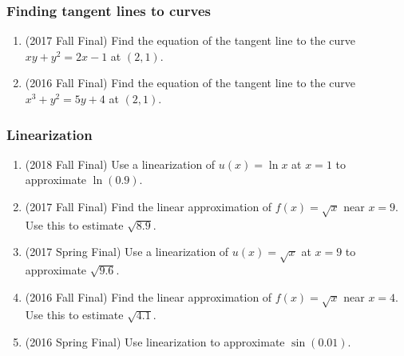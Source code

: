 \documentclass[10pt]{scrartcl}
\begin{document}
\subsubsection{Finding tangent lines to curves}
\begin{enumerate}
\item (2017 Fall Final) Find the equation of the tangent line to the curve $xy + y^2 = 2x - 1$ at $(2, 1)$.
\item (2016 Fall Final) Find the equation of the tangent line to the curve $x^3 + y^2 = 5y + 4$ at $(2, 1)$.
\end{enumerate}

\subsubsection{Linearization}
\begin{enumerate}
\item (2018 Fall Final) Use a linearization of $u(x) = \ln x$ at $x = 1$ to approximate $\ln(0.9)$.
\item (2017 Fall Final) Find the linear approximation of $f(x) = \sqrt{x}$ near $x = 9$. Use this to estimate $\sqrt{8.9}$.
\item (2017 Spring Final) Use a linearization of $u(x) = \sqrt{x}$ at $x = 9$ to approximate $\sqrt{9.6}$.
\item (2016 Fall Final) Find the linear approximation of $f(x) = \sqrt{x}$ near $x = 4$. Use this to estimate $\sqrt{4.1}$.
\item (2016 Spring Final) Use linearization to approximate $\sin(0.01)$. 
\end{enumerate}
\end{document}
